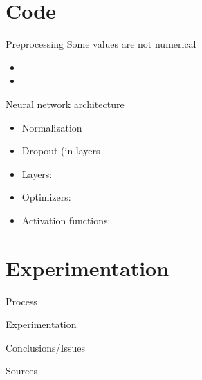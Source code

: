 \documentclass{beamer}
\begin{document}
\section{Code}
\begin{frame}{Preprocessing}
Some values are not numerical
\begin{itemize}
    \item 
    \item
\end{itemize}

\end{frame}

\begin{frame}{Neural network architecture}
    \begin{itemize}
        \item Normalization
        \item Dropout (in layers %
        \item Layers:
        \item Optimizers:
        \item Activation functions: 
    \end{itemize}
    
\end{frame}


\section{Experimentation}
\begin{frame}{Process}
\end{frame}

\begin{frame}{Experimentation}
    
\end{frame}

\begin{frame}{Conclusions/Issues}
    
    
\end{frame}

\begin{frame}{Sources}

    

\end{frame}
\end{document}

